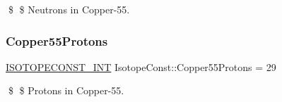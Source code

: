 \$ \$ Neutrons in Copper-\/55. \mbox{\label{group___isotope_const-_copper-_cu55_gaf8636d25b1036aa24074c5d4968c0e28}} 
\subsubsection{\texorpdfstring{Copper55\+Protons}{Copper55Protons}}
{\footnotesize\ttfamily \mbox{\hyperlink{group___isotope_const-_macros_ga5f18360b3e99483a35c32d789e62621c}{I\+S\+O\+T\+O\+P\+E\+C\+O\+N\+S\+T\+\_\+\+I\+NT}} Isotope\+Const\+::\+Copper55\+Protons = 29}

\$ \$ Protons in Copper-\/55. 
